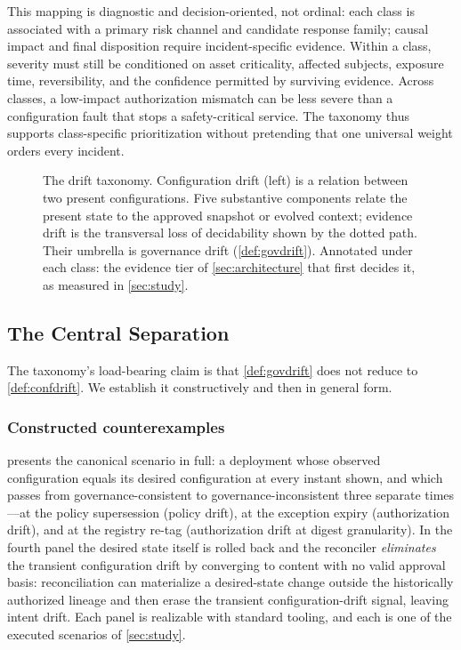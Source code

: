 This mapping is diagnostic and decision-oriented, not ordinal: each class is
associated with a primary risk channel and candidate response family; causal
impact and final disposition require incident-specific evidence. Within a class, severity must still be
conditioned on asset criticality, affected subjects, exposure time,
reversibility, and the confidence permitted by surviving evidence. Across
classes, a low-impact authorization mismatch can be less severe than a
configuration fault that stops a safety-critical service. The taxonomy thus
supports class-specific prioritization without pretending that one universal
weight orders every incident.

\begin{figure}[t]
\centering
\resizebox{\columnwidth}{!}{}
\caption{The drift taxonomy. Configuration drift (left) is a relation between
two present configurations. Five substantive components relate the present
state to the approved snapshot or evolved context; evidence drift is the
transversal loss of decidability shown by the dotted path. Their umbrella is
governance drift (\cref{def:govdrift}). Annotated
under each class: the evidence tier of \cref{sec:architecture} that first
decides it, as measured in \cref{sec:study}.}
\label{fig:taxonomy}
\end{figure}

\subsection{The Central Separation}
\label{sec:separation}

The taxonomy's load-bearing claim is that \cref{def:govdrift} does not reduce
to \cref{def:confdrift}. We establish it constructively and then in general
form.

\subsubsection{Constructed counterexamples}
 presents the canonical scenario in full: a deployment
whose observed configuration equals its desired configuration at every instant
shown, and which passes from governance-consistent to governance-inconsistent
three separate times---at the policy supersession (policy drift), at the
exception expiry (authorization drift), and at the registry re-tag
(authorization drift at digest granularity). In the fourth panel the desired
state itself is rolled back and the reconciler \emph{eliminates} the
transient configuration drift by converging to content with no valid approval
basis: reconciliation can materialize a desired-state change outside the
historically authorized lineage and then erase the transient
configuration-drift signal, leaving intent drift.
Each panel is realizable with standard tooling, and each is one
of the executed scenarios of \cref{sec:study}.

